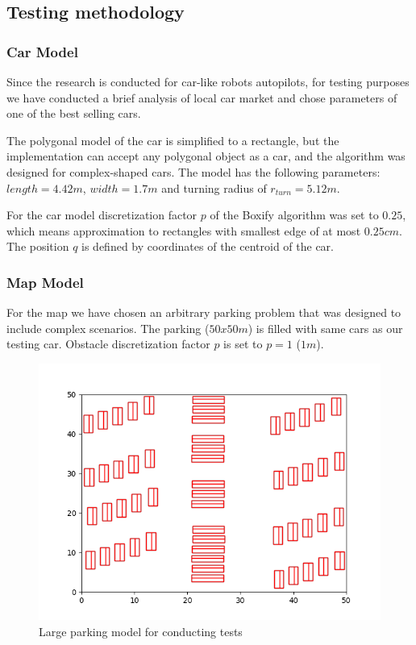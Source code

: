 \documentclass[a4paper,12pt]{article}
\DeclareRobustCommand{\[}{\begin{equation}}
\DeclareRobustCommand{\]}{\end{equation}}
\numberwithin{equation}{section}
\numberwithin{algorithm}{section}
\begin{document}
\subsection{Testing methodology}
\subsubsection{Car Model}

Since the research is conducted for car-like robots autopilots,
for testing purposes we have conducted a brief analysis of local car market and chose parameters of one of the best selling cars.

The polygonal model of the car is simplified to a rectangle, but the implementation can accept any polygonal object as a car,
and the algorithm was designed for complex-shaped cars. The model has the following parameters: $length=4.42m$, $width=1.7m$ and turning radius of $r_{turn}=5.12m$.

For the car model discretization factor $p$ of the Boxify algorithm was set to $0.25$, which means approximation to rectangles with smallest edge of at most $0.25cm$.
The position $q$ is defined by coordinates of the centroid of the car.

\subsubsection{Map Model}

For the map we have chosen an arbitrary parking problem that was designed to include complex scenarios. The parking ($50x50m$) is filled with same cars as our testing car.
Obstacle discretization factor $p$ is set to $p=1$ ($1m$).

\begin{figure}[H]
\begin{center}
\includegraphics[scale=0.7]{images/large_map.png}
\captionsetup{width=0.6\textwidth}
\caption{Large parking model for conducting tests}
\label{fig:large_map}
\end{center}
\end{figure}
\end{document}
